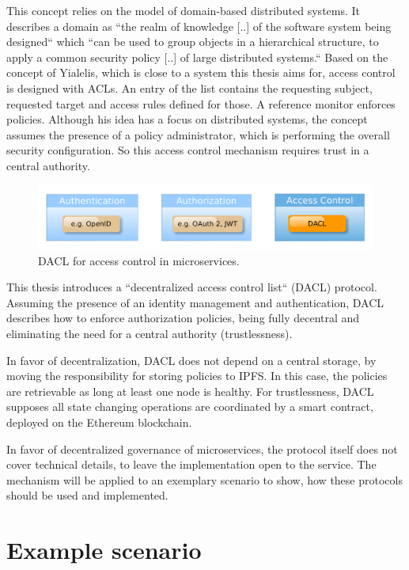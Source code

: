 \documentclass[12pt, conference]{IEEEtran}
\begin{document}
This concept relies on the model of domain-based distributed systems. It describes a domain as ``the realm of knowledge [..] of the software system being designed`` \cite{b2} which ``can be used to group
objects in a hierarchical structure, to apply a common security policy [..] of large distributed systems.`` \cite{b1} Based on the concept of Yialelis, which is close to a system this thesis aims for, access control is designed with ACLs. An entry of the list contains the requesting subject, requested target and access rules defined for those. A reference monitor enforces policies. Although his idea has a focus on distributed systems, the concept assumes the presence of a policy administrator, which is performing the overall security configuration. So this access control mechanism requires trust in a central authority. \\

\begin{figure}[!h]
  \includegraphics[width=\linewidth]{figures/access-control.png}
  \caption{DACL for access control in microservices.}
  \label{fig:access-control}
\end{figure}

This thesis introduces a ``decentralized access control list`` (DACL) protocol. Assuming the presence of an identity management and authentication, DACL describes how to enforce authorization policies, being fully decentral and eliminating the need for a central authority (trustlessness). 

In favor of decentralization, DACL does not depend on a central storage, by moving the responsibility for storing policies to IPFS. In this case, the policies are retrievable as long at least one node is healthy. For trustlessness, DACL supposes all state changing operations are coordinated by a smart contract, deployed on the Ethereum blockchain.

In favor of decentralized governance of microservices, the protocol itself does not cover technical details, to leave the implementation open to the service. The mechanism will be applied to an exemplary scenario to show, how these protocols should be used and implemented.
\section{Example scenario}
\end{document}
